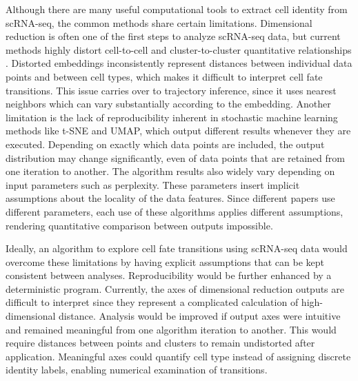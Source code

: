 \documentclass[aps,superscriptaddress, notitlepage,longbibliography]{revtex4-1}
\begin{document}
Although there are many useful computational tools to extract cell identity from scRNA-seq, the common methods share certain limitations. Dimensional reduction is often one of the first steps to analyze scRNA-seq data, but current methods highly distort cell-to-cell and cluster-to-cluster quantitative relationships \cite{chari_specious_2021}. Distorted embeddings inconsistently represent distances between individual data points and between cell types, which makes it difficult to interpret cell fate transitions. This issue carries over to trajectory inference, since it uses nearest neighbors which can vary substantially according to the embedding. Another limitation is the lack of reproducibility inherent in stochastic machine learning methods \cite{wattenberg_how_2016} like t-SNE and UMAP, which output different results whenever they are executed. Depending on exactly which data points are included, the output distribution may change significantly, even of data points that are retained from one iteration to another. The algorithm results also widely vary depending on input parameters such as perplexity. These parameters insert implicit assumptions about the locality of the data features. Since different papers use different parameters, each use of these algorithms applies different assumptions, rendering quantitative comparison between outputs impossible.

Ideally, an algorithm to explore cell fate transitions using scRNA-seq data would overcome these limitations by having explicit assumptions that can be kept consistent between analyses. Reproducibility would be further enhanced by a deterministic program. Currently, the axes of dimensional reduction outputs are difficult to interpret since they represent a complicated calculation of high-dimensional distance. Analysis would be improved if output axes were intuitive and remained meaningful from one algorithm iteration to another. This would require distances between points and clusters to remain undistorted after application. Meaningful axes could quantify cell type instead of assigning discrete identity labels, enabling numerical examination of transitions.
\end{document}
